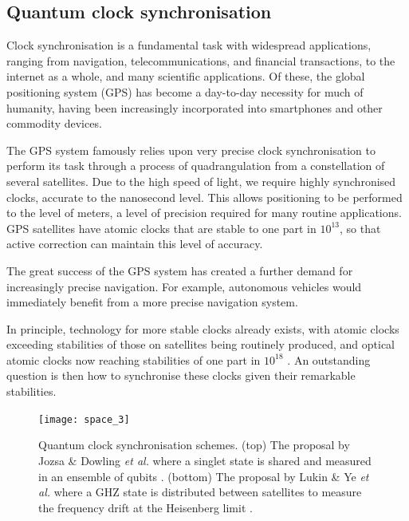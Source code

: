 %
%

\subsection{Quantum clock synchronisation} \label{sec:clock_sync}

Clock synchronisation is a fundamental task with widespread applications, ranging from navigation, telecommunications, and financial transactions, to the internet as a whole, and many scientific applications. Of these, the global positioning system (GPS) has become a day-to-day necessity for much of humanity, having been increasingly incorporated into smartphones and other commodity devices.

The GPS system famously relies upon very precise clock synchronisation to perform its task through a process of quadrangulation from a constellation of several satellites. Due to the high speed of light, we require highly synchronised clocks, accurate to the nanosecond level. This allows positioning to be performed to the level of meters, a level of precision required for many routine applications. GPS satellites have atomic clocks that are stable to one part in $10^{13}$, so that active correction can maintain this level of accuracy.

The great success of the GPS system has created a further demand for increasingly precise navigation. For example, autonomous vehicles would immediately benefit from a more precise navigation system.

In principle, technology for more stable clocks already exists, with atomic clocks exceeding stabilities of those on satellites being routinely produced, and optical atomic clocks now reaching stabilities of one part in $10^{18}$ \cite{bib:ludlow2015optical}. An outstanding question is then how to synchronise these clocks given their remarkable stabilities. 

\begin{figure}[!htbp]
\texttt{[image: space\_3]}
\captionspacefig \caption{Quantum clock synchronisation schemes. (top) The proposal by Jozsa \& Dowling \textit{et al.} where a singlet state is shared and measured in an ensemble of qubits \cite{bib:jozsa00}. (bottom) The proposal by Lukin \& Ye \textit{et al.} where a GHZ state is distributed between satellites to measure the frequency drift at the Heisenberg limit \cite{bib:komar14}.}
\label{fig:space_3}
\end{figure}

